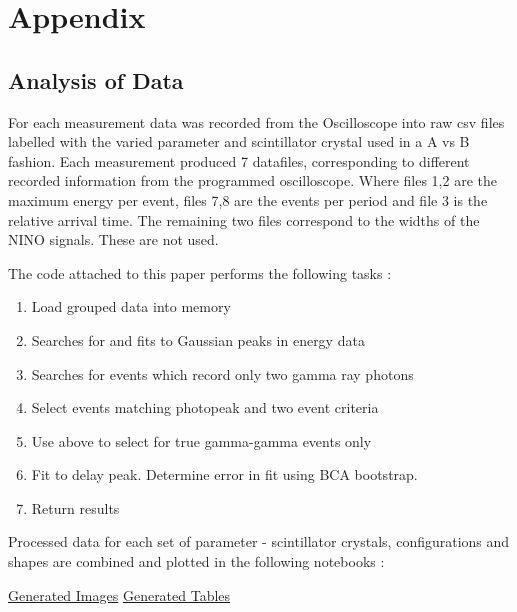 \section*{Appendix}
\subsection{Analysis of Data}
For each measurement data was recorded from the Oscilloscope into raw csv files labelled with the varied parameter and scintillator crystal used in a A vs B fashion. Each measurement produced 7 datafiles, corresponding to different recorded information from the programmed oscilloscope. Where files 1,2 are the maximum energy per event, files 7,8 are the events per period and file 3 is the relative arrival time. The remaining two files correspond to the widths of the NINO signals. These are not used.

The code attached to this paper performs the following tasks : 

\begin{enumerate}
\item Load grouped data into memory
\item Searches for and fits to Gaussian peaks in energy data
\item Searches for events which record only two gamma ray photons
\item Select events matching photopeak and two event criteria
\item Use above to select for true gamma-gamma events only
\item Fit to delay peak. Determine error in fit using BCA bootstrap.
\item Return results
\end{enumerate}

Processed data for each set of parameter - scintillator crystals, configurations and shapes are combined and plotted in the following notebooks :

\href{http://nbviewer.ipython.org/github/marksbrown/doipaper/blob/master/notebooks/Generate%20Images.ipynb}{Generated Images}
\href{http://nbviewer.ipython.org/github/marksbrown/doipaper/blob/master/notebooks/Generate%20Tables.ipynb}{Generated Tables}